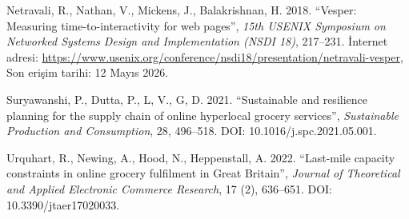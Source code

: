 \documentclass[11pt,a4paper]{article}
\begin{document}
\begin{enumerate}[label={[\arabic*]}]
    \item Netravali, R., Nathan, V., Mickens, J., Balakrishnan, H. 2018. ``Vesper: Measuring time-to-interactivity for web pages'', \textit{15th USENIX Symposium on Networked Systems Design and Implementation (NSDI 18)}, 217--231. İnternet adresi: \url{https://www.usenix.org/conference/nsdi18/presentation/netravali-vesper}, Son erişim tarihi: 12 Mayıs 2026.
    \item Suryawanshi, P., Dutta, P., L, V., G, D. 2021. ``Sustainable and resilience planning for the supply chain of online hyperlocal grocery services'', \textit{Sustainable Production and Consumption}, 28, 496--518. DOI: 10.1016/j.spc.2021.05.001.
    \item Urquhart, R., Newing, A., Hood, N., Heppenstall, A. 2022. ``Last-mile capacity constraints in online grocery fulfilment in Great Britain'', \textit{Journal of Theoretical and Applied Electronic Commerce Research}, 17 (2), 636--651. DOI: 10.3390/jtaer17020033.
\end{enumerate}
\end{document}
